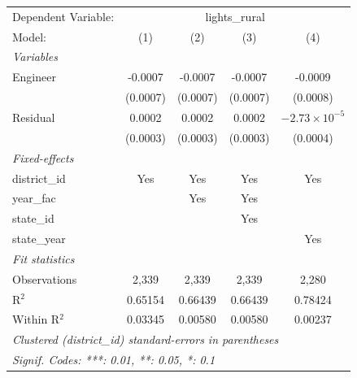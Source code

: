 
\begingroup
\centering
\begin{tabular}{lcccc}
   \tabularnewline \midrule \midrule
   Dependent Variable: & \multicolumn{4}{c}{lights\_rural}\\
   Model:        & (1)      & (2)      & (3)      & (4)\\  
   \midrule
   \emph{Variables}\\
   Engineer      & -0.0007  & -0.0007  & -0.0007  & -0.0009\\   
                 & (0.0007) & (0.0007) & (0.0007) & (0.0008)\\   
   Residual      & 0.0002   & 0.0002   & 0.0002   & $-2.73\times 10^{-5}$\\    
                 & (0.0003) & (0.0003) & (0.0003) & (0.0004)\\   
   \midrule
   \emph{Fixed-effects}\\
   district\_id  & Yes      & Yes      & Yes      & Yes\\  
   year\_fac     &          & Yes      & Yes      & \\  
   state\_id     &          &          & Yes      & \\  
   state\_year   &          &          &          & Yes\\  
   \midrule
   \emph{Fit statistics}\\
   Observations  & 2,339    & 2,339    & 2,339    & 2,280\\  
   R$^2$         & 0.65154  & 0.66439  & 0.66439  & 0.78424\\  
   Within R$^2$  & 0.03345  & 0.00580  & 0.00580  & 0.00237\\  
   \midrule \midrule
   \multicolumn{5}{l}{\emph{Clustered (district\_id) standard-errors in parentheses}}\\
   \multicolumn{5}{l}{\emph{Signif. Codes: ***: 0.01, **: 0.05, *: 0.1}}\\
\end{tabular}
\par\endgroup


